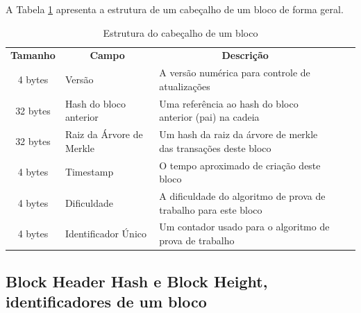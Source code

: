     A Tabela \ref{tabela_estrutura_cabecalho_de_um_bloco} apresenta a estrutura de um cabeçalho de um bloco de forma geral.
    
    
    \begin{table}[H]
        \caption{Estrutura do cabeçalho de um bloco}
        \begin{adjustbox}{width=\textwidth}

        \begin{tabular}{|c|l|l|ll}
        \cline{1-3}
        \cellcolor[HTML]{FFFFFF}\textbf{Tamanho} & \multicolumn{1}{c|}{\cellcolor[HTML]{FFFFFF}\textbf{Campo}} & \multicolumn{1}{c|}{\cellcolor[HTML]{FFFFFF}\textbf{Descrição}} &  &  \\ \cline{1-3}
        4 bytes                                  & Versão                                                      & A versão numérica para controle de atualizações                 &  &  \\ \cline{1-3}
        32 bytes                                 & Hash do bloco anterior                                      & Uma referência ao hash do bloco anterior (pai) na cadeia        &  &  \\ \cline{1-3}
        32 bytes                                 & Raiz da Árvore de Merkle                                    & Um hash da raiz da árvore de merkle das transações deste bloco  &  &  \\ \cline{1-3}
        4 bytes                                  & Timestamp                                                   & O tempo aproximado de criação deste bloco                       &  &  \\ \cline{1-3}
        4 bytes                                  & Dificuldade                                                 & A dificuldade do algoritmo de prova de trabalho para este bloco &  &  \\ \cline{1-3}
        4 bytes                                  & Identificador Único                                         & Um contador usado para o algoritmo de prova de trabalho         &  &  \\ \cline{1-3}
        \end{tabular}
        \end{adjustbox}
        \label{tabela_estrutura_cabecalho_de_um_bloco}
\end{table}


    \subsection{Block Header Hash e Block Height, identificadores de um bloco}
    
